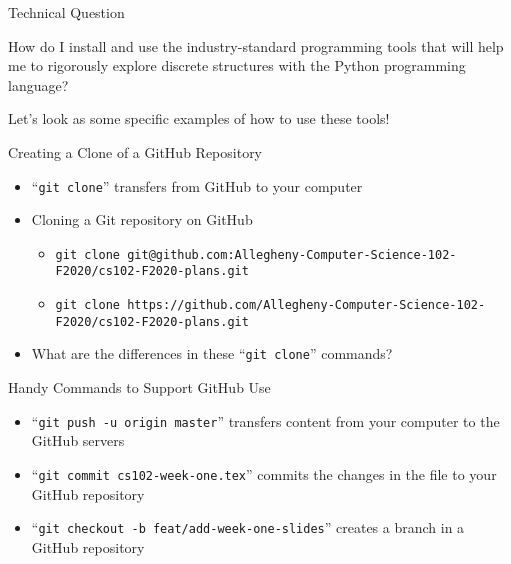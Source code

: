 \documentclass[14pt,aspectratio=169]{beamer}
\begin{document}
%
\begin{frame}{Technical Question}
  \begin{center}
    {\large How do I install and use the industry-standard programming tools that will
      help me to rigorously explore discrete structures with the Python
    programming language?}
  \end{center}
  \vspace{2ex}
  \begin{center}
    \small Let's look as some specific examples of how to use these tools!
  \end{center}
\end{frame}

%
\begin{frame}{Creating a Clone of a GitHub Repository}
  \begin{itemize}
    \item ``{\tt git clone}'' transfers from GitHub to your computer
    \item Cloning a Git repository on GitHub
      {\scriptsize
        \begin{itemize}
          \item {\tt git clone git@github.com:Allegheny-Computer-Science-102-F2020/cs102-F2020-plans.git}
          \item {\tt git clone https://github.com/Allegheny-Computer-Science-102-F2020/cs102-F2020-plans.git}
        \end{itemize}
      }
    \item What are the differences in these ``{\tt git clone}'' commands?
  \end{itemize}
\end{frame}

%
\begin{frame}{Handy Commands to Support GitHub Use}
  \begin{itemize}
    \item ``{\tt git push -u origin master}'' transfers content from your computer
      to the GitHub servers
    \item ``{\tt git commit cs102-week-one.tex}'' commits the changes in the
      file to your GitHub repository
    \item ``{\tt git checkout -b feat/add-week-one-slides}'' creates a branch in
      a GitHub repository
  \end{itemize}
\end{frame}
\end{document}
